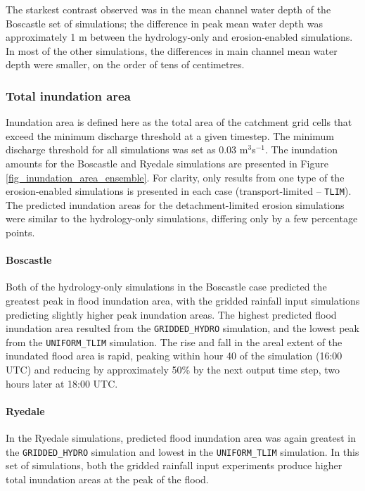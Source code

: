 The starkest contrast observed was in the mean channel water depth of the Boscastle set of simulations; the difference in peak mean water depth was approximately 1 m between the hydrology-only and erosion-enabled simulations. In most of the other simulations, the differences in main channel mean water depth were smaller, on the order of tens of centimetres.

\subsubsection{Total inundation area}
Inundation area is defined here as the total area of the catchment grid cells that exceed the minimum discharge threshold at a given timestep. The minimum discharge threshold for all simulations was set as 0.03 m\(^3\)s\(^{-1}\). The inundation amounts for the Boscastle and Ryedale simulations are presented in Figure \ref{fig_inundation_area_ensemble}. For clarity, only results from one type of the erosion-enabled simulations is presented in each case (transport-limited -- \texttt{TLIM}). The predicted inundation areas for the detachment-limited erosion simulations were similar to the hydrology-only simulations, differing only by a few percentage points.

\paragraph{Boscastle}
Both of the hydrology-only simulations in the Boscastle case predicted the greatest peak in flood inundation area, with the gridded rainfall input simulations predicting slightly higher peak inundation areas. The highest predicted flood inundation area resulted from the \texttt{GRIDDED\_HYDRO} simulation, and the lowest peak from the \texttt{UNIFORM\_TLIM} simulation. The rise and fall in the areal extent of the inundated flood area is rapid, peaking within hour 40 of the simulation  (16:00 UTC) and reducing by approximately 50\% by the next output time step, two hours later at 18:00 UTC. 

\paragraph{Ryedale}
In the Ryedale simulations, predicted flood inundation area was again greatest in the \texttt{GRIDDED\_HYDRO} simulation and lowest in the \texttt{UNIFORM\_TLIM} simulation. In this set of simulations, both the gridded rainfall input experiments produce higher total inundation areas at the peak of the flood.


